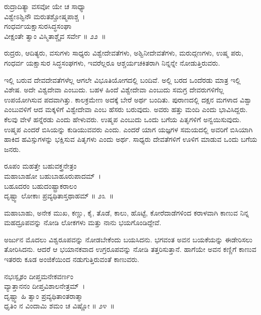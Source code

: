 \begin{shloka}
ರುದ್ರಾದಿತ್ಯಾ ವಸವೋ ಯೇ ಚ ಸಾಧ್ಯಾ \\ ವಿಶ್ವೇಽಶ್ವಿನೌ ಮರುತಶ್ಚೋಷ್ಮಪಾಶ್ಚ~।\\ಗಂಧರ್ವಯಕ್ಷಾಸುರಸಿದ್ಧಸಂಘಾ \\ ವೀಕ್ಷಂತೇ ತ್ವಾಂ ವಿಸ್ಮಿತಾಶ್ಚೈವ ಸರ್ವೇ \hfill॥ ೨೨~॥
\end{shloka}

\begin{artha}
ರುದ್ರರು, ಆದಿತ್ಯರು, ವಸುಗಳು ಸಾಧ್ಯರು ವಿಶ್ವೇದೇವತೆಗಳು, ಅಶ್ವಿನೀದೇವತೆಗಳು, ಮರುದ್ಗಣಗಳು, ಉಷ್ಮ ಪರು, ಗಂಧರ್ವ ಯಕ್ಷಾಸುರ ಸಿದ್ಧಸಂಘಗಳು, ಇವರೆಲ್ಲರೂ ಆಶ್ಚರ್ಯಚಕಿತರಾಗಿ ನಿನ್ನನ್ನೇ ನೋಡುತ್ತಿರುವರು.
\end{artha}

ಇಲ್ಲಿ ಬರುವ ದೇವದೇವತೆಗಳೆಲ್ಲ ಆಗಲೇ ವಿಭೂತಿಯೋಗದಲ್ಲಿ ಬಂದಿವೆ. ಅಲ್ಲಿ ಬರದ ಒಂದೆರಡು ಮಾತ್ರ ಇಲ್ಲಿ ವಿಶೇಷ. ಅದೇ ವಿಶ್ವದೇವಾ ಎಂಬುದು. ಬಹಳ ಹಿಂದೆ ವಿಶ್ವೇದೇವಾ ಎಂಬುದು ಸಮಗ್ರ ದೇವರುಗಳಿಗೆಲ್ಲ ಉಪಯೋಗಿಸುವ ಪದವಾಗಿತ್ತು. ಕಾಲಕ್ರಮೇಣ ಅದಕ್ಕೆ ಬೇರೆ ಅರ್ಥ ಬಂದಿತು. ಪುರಾಣದಲ್ಲಿ ದಕ್ಷನ ಮಗಳಾದ ವಿಶ್ವಾ ಎಂಬುವಳಿಗೆ ಆದ ಮಕ್ಕಳಿಗೆ ವಿಶ್ವೇದೇವಾ ಎಂಬ ಹೆಸರು ಬರುವುದು. ಅವರು ಹತ್ತು ಮಂದಿ ಎಂದು ಭಾವಿಸಿದ್ದರು. ಕೆಲವು ವೇಳೆ ಹನ್ನೆರಡು ಎಂದು ಹೇಳುವರು. ಉಷ್ಮಪ ಎಂಬುದು ಒಂದು ಬಗೆಯ ಪಿತೃಗಳಿಗೆ ಅನ್ವಯಿಸುವುದು. ಉಷ್ಮಪ ಎಂದರೆ ಬಿಸಿಯನ್ನು ಕುಡಿಯುವವರು ಎಂದು. ಎಂದರೆ ಯಾಗ ಯಜ್ಞಗಳ ಸಮಯದಲ್ಲಿ ಅವರಿಗೆ ಬಿಸಿಯಾಗಿ ಹಾಕಿದ ಹವಿಸ್ಸುಗಳನ್ನು ಭಕ್ಷಿಸುವ ಪಿತೃಗಳು ಎಂದು ಅರ್ಥ. ಸಾಧ್ಯರು ದೇವತೆಗಳಿಗೆ ಊಳಿಗ ಮಾಡುವ ಒಂದು ಬಗೆಯ ಜನರು.

\begin{shloka}
ರೂಪಂ ಮಹತ್ತೇ ಬಹುವಕ್ತ್ರನೇತ್ರಂ \\ ಮಹಾಬಾಹೋ ಬಹುಬಾಹೂರುಪಾದಮ್~।\\ಬಹೂದರಂ ಬಹುದಂಷ್ಟ್ರಾಕರಾಲಂ \\ ದೃಷ್ಟ್ವಾ ಲೋಕಾಃ ಪ್ರವ್ಯಥಿತಾಸ್ತಥಾಹಮ್ \hfill॥ ೨೩~॥
\end{shloka}

\begin{artha}
ಮಹಾಬಾಹು, ಅನೇಕ ಮುಖ, ಕಣ್ಣು, ಕೈ, ತೊಡೆ, ಕಾಲು, ಹೊಟ್ಟೆ, ಕೋರೆದಾಡೆಗಳಿಂದ ಕರಾಳವಾಗಿ ಕಾಣುವ ನಿನ್ನ ಮಹದ್ರೂಪವನ್ನು ನೋಡಿ ಲೋಕಗಳು ಮತ್ತು ನಾನು ಭಯಗೊಂಡಿದ್ದೇವೆ.
\end{artha}

ಅರ್ಜುನ ಮೊದಲು ವಿಶ್ವರೂಪವನ್ನು ನೋಡಬೇಕೆಂದು ಬಯಸಿದನು. ಭಗವಂತ ಅವನ ಬಯಕೆಯನ್ನು ಈಡೇರಿಸಲು ತೋರಿಸಿದನು. ಆದರೆ ಆ ಭಯಾನಕವಾದ ಉಗ್ರರೂಪವನ್ನು ನೋಡಿ ತತ್ತರಿಸುತ್ತಾನೆ. ಹಾಗೆಯೇ ಅವನ ಕಣ್ಣಿಗೆ ಕಾಣುವ ಇತರರು ಕೂಡ ಅಂಜಿಕೆಯಿಂದ ನಡುಗುತ್ತಿರುವಂತೆ ಕಾಣುವರು.

\begin{shloka}
ನಭಃಸ್ಪೃಶಂ ದೀಪ್ತಮನೇಕವರ್ಣಂ \\ ವ್ಯಾತ್ತಾನನಂ ದೀಪ್ತವಿಶಾಲನೇತ್ರಮ್~।\\ದೃಷ್ಟ್ವಾ ಹಿ ತ್ವಾಂ ಪ್ರವ್ಯಥಿತಾಂತರಾತ್ಮಾ \\ ಧೃತಿಂ ನ ವಿಂದಾಮಿ ಶಮಂ ಚ ವಿಷ್ಣೋ \hfill॥ ೨೪~॥
\end{shloka}

